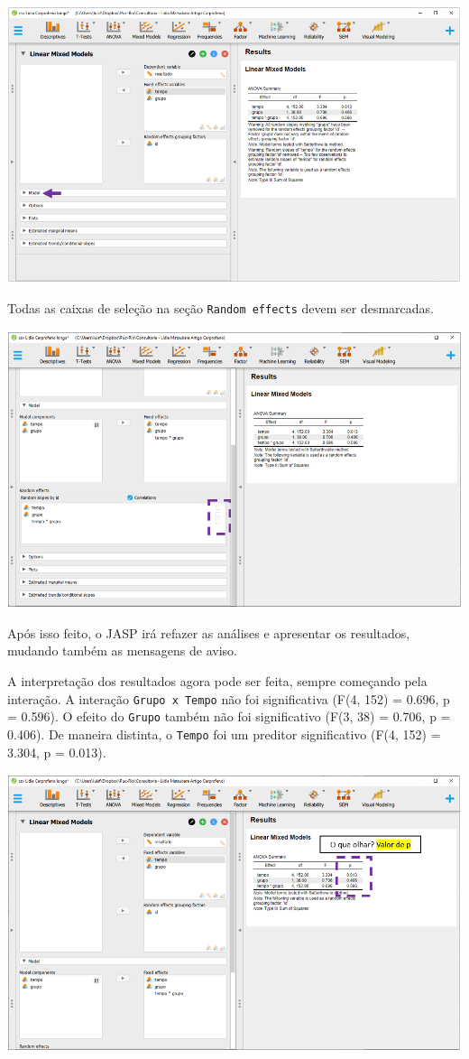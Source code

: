 \documentclass[
]{book}
\begin{document}
\includegraphics{./img/cap_lmm_model.png}

Todas as caixas de seleção na seção \texttt{Random\ effects} devem ser desmarcadas.

\includegraphics{./img/cap_lmm_model2.png}

Após isso feito, o JASP irá refazer as análises e apresentar os resultados, mudando também as mensagens de aviso.

A interpretação dos resultados agora pode ser feita, sempre começando pela interação. A interação \texttt{Grupo\ x\ Tempo} não foi significativa (F(4, 152) = 0.696, p = 0.596). O efeito do \texttt{Grupo} também não foi significativo (F(3, 38) = 0.706, p = 0.406). De maneira distinta, o \texttt{Tempo} foi um preditor significativo (F(4, 152) = 3.304, p = 0.013).

\includegraphics{./img/cap_lmm_resultados.png}
\end{document}
